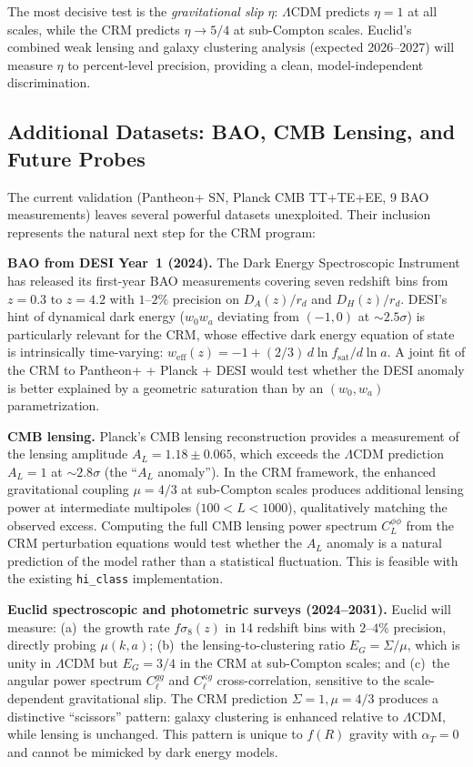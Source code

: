 \documentclass[aps,prd,twocolumn,superscriptaddress,nofootinbib]{revtex4-2}
\begin{document}
The most decisive test is the \textit{gravitational slip} $\eta$: $\Lambda$CDM predicts $\eta = 1$ at all scales, while the CRM predicts $\eta \to 5/4$ at sub-Compton scales. Euclid's combined weak lensing and galaxy clustering analysis (expected 2026--2027) will measure $\eta$ to percent-level precision, providing a clean, model-independent discrimination.

\subsection{Additional Datasets: BAO, CMB Lensing, and Future Probes}
\label{subsec:future_data}

The current validation (Pantheon+ SN, Planck CMB TT+TE+EE, 9 BAO measurements) leaves several powerful datasets unexploited. Their inclusion represents the natural next step for the CRM program:

\textbf{BAO from DESI Year~1 (2024).} The Dark Energy Spectroscopic Instrument has released its first-year BAO measurements covering seven redshift bins from $z = 0.3$ to $z = 4.2$ with $1$--$2\%$ precision on $D_A(z)/r_d$ and $D_H(z)/r_d$. DESI's hint of dynamical dark energy ($w_0 w_a$ deviating from $(-1, 0)$ at $\sim 2.5\sigma$) is particularly relevant for the CRM, whose effective dark energy equation of state is intrinsically time-varying: $w_{\mathrm{eff}}(z) = -1 + (2/3)\,d\ln f_{\mathrm{sat}}/d\ln a$. A joint fit of the CRM to Pantheon+ + Planck + DESI would test whether the DESI anomaly is better explained by a geometric saturation than by an $(w_0, w_a)$ parametrization.

\textbf{CMB lensing.} Planck's CMB lensing reconstruction provides a measurement of the lensing amplitude $A_L = 1.18 \pm 0.065$, which exceeds the $\Lambda$CDM prediction $A_L = 1$ at $\sim 2.8\sigma$ (the ``$A_L$ anomaly''). In the CRM framework, the enhanced gravitational coupling $\mu = 4/3$ at sub-Compton scales produces additional lensing power at intermediate multipoles ($100 < L < 1000$), qualitatively matching the observed excess. Computing the full CMB lensing power spectrum $C_L^{\phi\phi}$ from the CRM perturbation equations would test whether the $A_L$ anomaly is a natural prediction of the model rather than a statistical fluctuation. This is feasible with the existing \texttt{hi\_class} implementation.

\textbf{Euclid spectroscopic and photometric surveys (2024--2031).} Euclid will measure: (a)~the growth rate $f\sigma_8(z)$ in 14 redshift bins with $2$--$4\%$ precision, directly probing $\mu(k,a)$; (b)~the lensing-to-clustering ratio $E_G = \Sigma/\mu$, which is unity in $\Lambda$CDM but $E_G = 3/4$ in the CRM at sub-Compton scales; and (c)~the angular power spectrum $C_\ell^{gg}$ and $C_\ell^{\kappa g}$ cross-correlation, sensitive to the scale-dependent gravitational slip. The CRM prediction $\Sigma = 1, \mu = 4/3$ produces a distinctive ``scissors'' pattern: galaxy clustering is enhanced relative to $\Lambda$CDM, while lensing is unchanged. This pattern is unique to $f(R)$ gravity with $\alpha_T = 0$ and cannot be mimicked by dark energy models.
\end{document}
